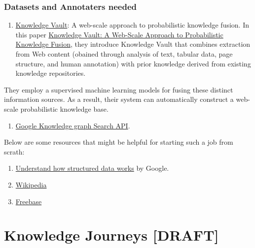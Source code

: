 \documentclass[]{book}
\providecommand{\tightlist}{%
  \setlength{\itemsep}{0pt}\setlength{\parskip}{0pt}}
\theoremstyle{definition}
\theoremstyle{definition}
\theoremstyle{definition}
\theoremstyle{remark}
\begin{document}
\subsubsection{Datasets and Annotaters
needed}\label{datasets-and-annotaters-needed}

\begin{enumerate}
\def\labelenumi{\arabic{enumi}.}
\tightlist
\item
  \href{https://ai.google/research/pubs/pub45634}{Knowledge Vault}: A
  web-scale approach to probabilistic knowledge fusion. In this paper
  \href{https://dejanseo.com.au/wp-content/uploads/2014/08/Knowledge-Vault-A-Web-Scale-Approach-to-Probabilistic-Knowledge-Fusion.pdf}{Knowledge
  Vault: A Web-Scale Approach to Probabilistic Knowledge Fusion}, they
  introduce Knowledge Vault that combines extraction from Web content
  (obained through analysis of text, tabular data, page structure, and
  human annotation) with prior knowledge derived from existing knowledge
  repositories.
\end{enumerate}

They employ a supervised machine learning models for fusing these
distinct information sources. As a result, their system can
automatically construct a web-scale probabilistic knowledge base.

\begin{enumerate}
\def\labelenumi{\arabic{enumi}.}
\setcounter{enumi}{1}
\tightlist
\item
  \href{https://developers.google.com/knowledge-graph/\#knowledge_graph_entities}{Google
  Knowledge graph Search API}.
\end{enumerate}

Below are some resources that might be helpful for starting such a job
from scrath:

\begin{enumerate}
\def\labelenumi{\arabic{enumi}.}
\setcounter{enumi}{2}
\item
  \href{https://developers.google.com/search/docs/guides/intro-structured-data}{Understand
  how structured data works} by Google.
\item
  \href{wikipedia.com}{Wikipedia}
\item
  \href{Freebase.com}{Freebase}
\end{enumerate}

\section{Knowledge Journeys {[}DRAFT{]}}\label{knowledge-journeys-draft}
\end{document}
